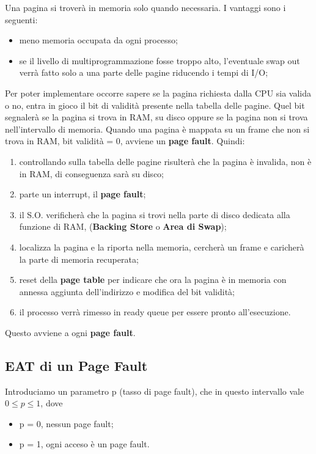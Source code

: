 \documentclass[a4paper, 12pt]{book}
\begin{document}
Una pagina si troverà in memoria solo quando necessaria. I vantaggi sono i seguenti:
\begin{itemize}
    \item meno memoria occupata da ogni processo;
    \item se il livello di multiprogrammazione fosse troppo alto, l'eventuale swap out verrà fatto solo a una parte delle pagine riducendo i tempi di I/O;
\end{itemize}

Per poter implementare occorre sapere se la pagina richiesta dalla CPU sia valida o no, entra in gioco il bit di validità presente
nella tabella delle pagine. Quel bit segnalerà se la pagina si trova in RAM, su disco oppure se la pagina non si trova 
nell'intervallo di memoria. Quando una pagina è mappata su un frame che non si trova in RAM, bit validità = 0, avviene un \textbf{page fault}.
Quindi:

\begin{enumerate}
    \item controllando sulla tabella delle pagine risulterà che la pagina è invalida, non è in RAM, di conseguenza sarà su disco;
    \item parte un interrupt, il \textbf{page fault};
    \item il S.O. verificherà che la pagina si trovi nella parte di disco dedicata alla funzione di RAM, (\textbf{Backing Store} o \textbf{Area di Swap});
    \item localizza la pagina e la riporta nella memoria, cercherà un frame e caricherà la parte di memoria recuperata;
    \item reset della \textbf{page table} per indicare che ora la pagina è in memoria con annessa aggiunta dell'indirizzo e modifica del bit validità;
    \item il processo verrà rimesso in ready queue per essere pronto all'esecuzione.
\end{enumerate}

Questo avviene a ogni \textbf{page fault}. 

\subsection{EAT di un Page Fault}

Introduciamo un parametro p (tasso di page fault), che in questo intervallo vale $0 \le p \le 1$, dove 

\begin{itemize}
    \item p = 0, nessun page fault;
    \item p = 1, ogni acceso è un page fault.
\end{itemize}
\end{document}
